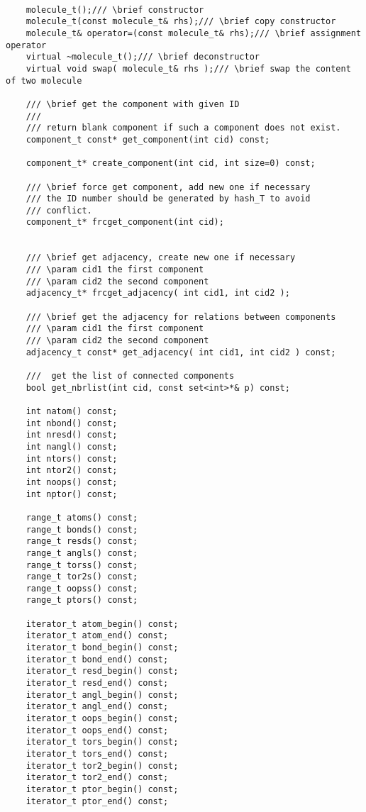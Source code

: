 \documentclass[letterpaper]{book}
\begin{document}
\begin{lstlisting}

    molecule_t();/// \brief constructor
    molecule_t(const molecule_t& rhs);/// \brief copy constructor
    molecule_t& operator=(const molecule_t& rhs);/// \brief assignment operator
    virtual ~molecule_t();/// \brief deconstructor
    virtual void swap( molecule_t& rhs );/// \brief swap the content of two molecule

    /// \brief get the component with given ID
    ///
    /// return blank component if such a component does not exist.
    component_t const* get_component(int cid) const;

    component_t* create_component(int cid, int size=0) const;

    /// \brief force get component, add new one if necessary 
    /// the ID number should be generated by hash_T to avoid
    /// conflict.
    component_t* frcget_component(int cid);


    /// \brief get adjacency, create new one if necessary
    /// \param cid1 the first component
    /// \param cid2 the second component
    adjacency_t* frcget_adjacency( int cid1, int cid2 );
    
    /// \brief get the adjacency for relations between components
    /// \param cid1 the first component
    /// \param cid2 the second component
    adjacency_t const* get_adjacency( int cid1, int cid2 ) const;

    ///  get the list of connected components
    bool get_nbrlist(int cid, const set<int>*& p) const;
        
    int natom() const;
    int nbond() const;
    int nresd() const;
    int nangl() const;
    int ntors() const;
    int ntor2() const;
    int noops() const;
    int nptor() const;

    range_t atoms() const;
    range_t bonds() const;
    range_t resds() const;
    range_t angls() const;
    range_t torss() const;
    range_t tor2s() const;
    range_t oopss() const;
    range_t ptors() const;

    iterator_t atom_begin() const;
    iterator_t atom_end() const;
    iterator_t bond_begin() const;
    iterator_t bond_end() const;
    iterator_t resd_begin() const;
    iterator_t resd_end() const;
    iterator_t angl_begin() const;
    iterator_t angl_end() const;
    iterator_t oops_begin() const;
    iterator_t oops_end() const;
    iterator_t tors_begin() const;
    iterator_t tors_end() const;
    iterator_t tor2_begin() const;
    iterator_t tor2_end() const;
    iterator_t ptor_begin() const;
    iterator_t ptor_end() const;


\end{lstlisting}
\end{document}
